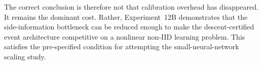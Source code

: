 The correct conclusion is therefore not that calibration overhead has disappeared. It remains the dominant cost. Rather, Experiment~12B demonstrates that the side-information bottleneck can be reduced enough to make the descent-certified event architecture competitive on a nonlinear non-IID learning problem. This satisfies the pre-specified condition for attempting the small-neural-network scaling study.
